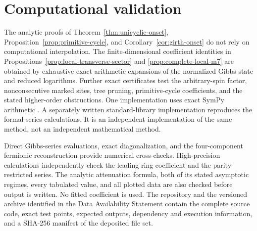 \documentclass[aps,prb,preprint,nofootinbib,longbibliography]{revtex4-2}
\begin{document}
\section{Computational validation}
\label{app:reproducibility}

The analytic proofs of Theorem~\ref{thm:unicyclic-onset},
Proposition~\ref{prop:primitive-cycle}, and Corollary~\ref{cor:girth-onset} do
not rely on computational interpolation.  The finite-dimensional coefficient
identities in Propositions~\ref{prop:local-transverse-sector} and
\ref{prop:complete-local-m7} are obtained by exhaustive exact-arithmetic
expansions of the normalized Gibbs state and reduced logarithms.  Further
exact certificates test the arbitrary-spin factor, nonconsecutive marked
sites, tree pruning, primitive-cycle coefficients, and the stated
higher-order obstructions.  One implementation uses exact SymPy arithmetic
\cite{MeurerEtAl2017}.  A separately written standard-library implementation
reproduces the formal-series calculations.  It is an independent
implementation of the same method, not an independent mathematical method.

Direct Gibbs-series evaluations, exact diagonalization, and the four-component
fermionic reconstruction provide numerical cross-checks.  High-precision
calculations independently check the leading ring coefficient and the
parity-restricted series.  The analytic attenuation formula, both of its
stated asymptotic regimes, every tabulated value, and all plotted data are
also checked before output is written.  No fitted coefficient is used.  The
repository and the versioned archive identified in the Data Availability
Statement contain the complete source code, exact test points, expected
outputs, dependency and execution information, and a SHA-256 manifest of the
deposited file set.
\end{document}
